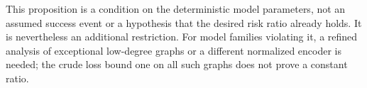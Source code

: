 This proposition is a condition on the deterministic model parameters,
not an assumed success event or a hypothesis that the desired risk ratio
already holds. It is nevertheless an additional restriction. For model
families violating it, a refined analysis of exceptional low-degree
graphs or a different normalized encoder is needed; the crude loss bound
one on all such graphs does not prove a constant ratio.

